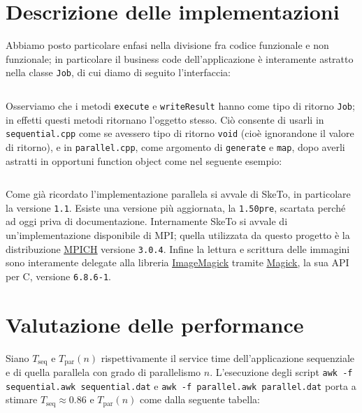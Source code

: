 \documentclass[12pt]{article}
\newcommand{\cpp}{C\nolinebreak\hspace{-.05em}\raisebox{.4ex}{\tiny\bf +}\nolinebreak\hspace{-.10em}\raisebox{.4ex}{\tiny\bf +}}
\newcommand{\mpp}{Magick\nolinebreak\hspace{-.05em}\raisebox{.4ex}{\tiny\bf +}\nolinebreak\hspace{-.10em}\raisebox{.4ex}{\tiny\bf +}}
\begin{document}
    \section{Descrizione delle implementazioni}

    Abbiamo posto particolare enfasi nella divisione fra codice funzionale e
    non funzionale; in particolare il business code dell'applicazione è
    interamente astratto nella classe \texttt{Job}, di cui diamo di seguito
    l'interfaccia:

    \inputminted[]{c++}{src/job.h}

    Osserviamo che i metodi \texttt{execute} e \texttt{writeResult} hanno
    come tipo di ritorno \texttt{Job}; in effetti questi metodi ritornano
    l'oggetto stesso. Ciò consente di usarli in \texttt{sequential.cpp} come
    se avessero tipo di ritorno \texttt{void} (cio\`e ignorandone il valore
    di ritorno), e in \texttt{parallel.cpp}, come argomento di
    \texttt{generate} e \texttt{map}, dopo averli astratti in opportuni
    function object come nel seguente esempio:

    \inputminted[]{c++}{tex/src/function-object.cpp}

    Come gi\`a ricordato l'implementazione parallela si avvale di SkeTo, in
    particolare la versione \texttt{1.1}. Esiste una versione pi\`u aggiornata,
    la \texttt{1.50pre}, scartata perch\'e ad oggi priva di documentazione.
    Internamente SkeTo si avvale di un'implementazione disponibile di MPI;
    quella utilizzata da questo progetto \`e la distribuzione
    \href{http://www.mpich.org}{\underline{MPICH}} versione \texttt{3.0.4}. 
    Infine la lettura e scrittura delle immagini sono interamente delegate alla
    libreria \href{http://www.imagemagick.org/script/index.php}{\underline{ImageMagick}}
    tramite \href{http://www.imagemagick.org/script/magick++.php}{\underline{\mpp}},
    la sua API per \cpp, versione \texttt{6.8.6-1}.

    \section{Valutazione delle performance}

    Siano \(T_{\text{seq}}\) e \(T_{\text{par}}(n)\) rispettivamente il 
    service time dell'applicazione sequenziale e di quella parallela con
    grado di parallelismo \(n\). L'esecuzione degli script
    \texttt{awk -f sequential.awk sequential.dat} e
    \texttt{awk -f parallel.awk parallel.dat} porta a stimare
    \(T_{\text{seq}} \approx 0.86\) e \(T_{\text{par}}(n)\) come
    dalla seguente tabella:
\end{document}
